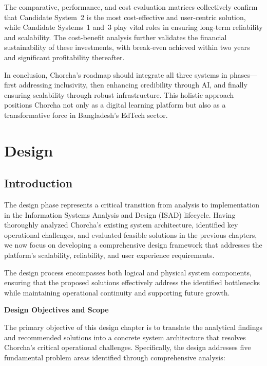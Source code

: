 \documentclass[12pt,a4paper,oneside]{book}
\begin{document}
The comparative, performance, and cost evaluation matrices collectively confirm that Candidate System~2 is the most cost-effective and user-centric solution, while Candidate Systems~1 and~3 play vital roles in ensuring long-term reliability and scalability. The cost-benefit analysis further validates the financial sustainability of these investments, with break-even achieved within two years and significant profitability thereafter.

In conclusion, Chorcha’s roadmap should integrate all three systems in phases---first addressing inclusivity, then enhancing credibility through AI, and finally ensuring scalability through robust infrastructure. This holistic approach positions Chorcha not only as a digital learning platform but also as a transformative force in Bangladesh’s EdTech sector.


\newpage

\chapter{Design}

\section{Introduction}

The design phase represents a critical transition from analysis to implementation in the Information Systems Analysis and Design (ISAD) lifecycle. Having thoroughly analyzed Chorcha's existing system architecture, identified key operational challenges, and evaluated feasible solutions in the previous chapters, we now focus on developing a comprehensive design framework that addresses the platform's scalability, reliability, and user experience requirements.

The design process encompasses both logical and physical system components, ensuring that the proposed solutions effectively address the identified bottlenecks while maintaining operational continuity and supporting future growth.

\textbf{Design Objectives and Scope}

The primary objective of this design chapter is to translate the analytical findings and recommended solutions into a concrete system architecture that resolves Chorcha's critical operational challenges. Specifically, the design addresses five fundamental problem areas identified through comprehensive analysis:
\end{document}
